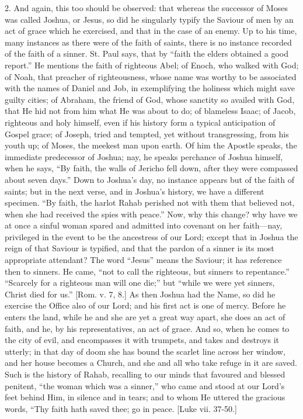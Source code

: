 2. And again, this too should be observed: that whereas the
successor of Moses was called Joshua, or Jesus, so did he singularly
typify the Saviour of men by an act of grace which he exercised, and
that in the case of an enemy. Up to his time, many instances as there
were of the faith of saints, there is no instance recorded of the
faith of a sinner. St. Paul says, that by ``faith the elders
obtained a good report.'' He mentions the faith of righteous Abel;
of Enoch, who walked with God; of Noah, that preacher of
righteousness, whose name was worthy to be associated with the names
of Daniel and Job, in exemplifying the holiness which might save
guilty cities; of Abraham, the friend of God, whose sanctity so
availed with God, that He hid not from him what He was about to do; of
blameless Isaac; of Jacob, righteous and holy himself, even if his
history form a typical anticipation of Gospel grace; of Joseph, tried
and tempted, yet without transgressing, from his youth up; of Moses,
the meekest man upon earth. Of him the Apostle speaks, the immediate
predecessor of Joshua; nay, he speaks perchance of Joshua himself,
when he says, ``By faith, the walls of Jericho fell down, after
they were compassed about seven days.'' Down to Joshua's day, no
instance appears but of the faith of saints; but in the next verse,
and in Joshua's history, we have a different specimen. ``By faith,
the harlot Rahab perished not with them that believed not, when she
had received the spies with peace.'' Now, why this change? why
have we at once a sinful woman spared and admitted into covenant on
her faith—nay, privileged in the event to be the ancestress of our
Lord; except that in Joshua the reign of that Saviour is typified, and
that the pardon of a sinner is its most appropriate attendant? The
word ``Jesus'' means the Saviour; it has reference then to
sinners. He came, ``not to call the righteous, but sinners to
repentance.'' ``Scarcely for a righteous man will one
die;'' but ``while we were yet sinners, Christ died for
us.'' [Rom. v. 7, 8.] As then Joshua had the Name, so did he
exercise the Office also of our Lord; and his first act is one of
mercy. Before he enters the land, while he and she are yet a great way
apart, she does an act of faith, and he, by his representatives, an
act of grace. And so, when he comes to the city of evil, and
encompasses it with trumpets, and takes and destroys it utterly; in
that day of doom she has bound the scarlet line across her window, and
her house becomes a Church, and she and all who take refuge in it are
saved. Such is the history of Rahab, recalling to our minds that
favoured and blessed penitent, ``the woman which was a
sinner,'' who came and stood at our Lord's feet behind Him, in
silence and in tears; and to whom He uttered the gracious words,
``Thy faith hath saved thee; go in peace. [Luke vii. 37-50.]

